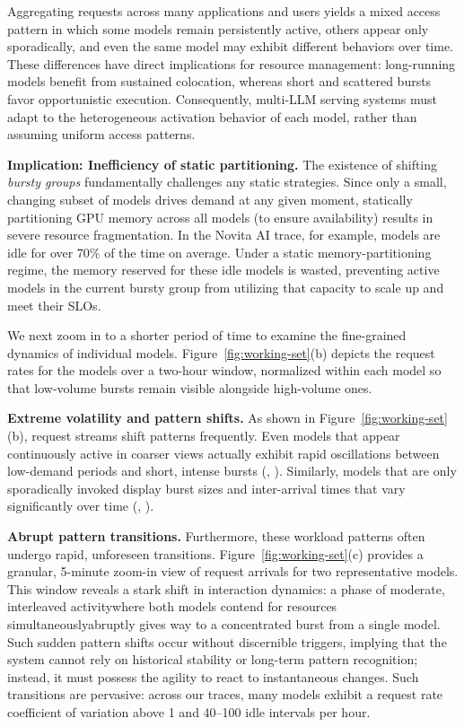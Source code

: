 Aggregating requests across many applications and users yields a mixed access pattern in which some models remain persistently active, others appear only sporadically, and even the same model may exhibit different behaviors over time. These differences have direct implications for resource management: long-running models benefit from sustained colocation, whereas short and scattered bursts favor opportunistic execution. Consequently, multi-LLM serving systems must adapt to the heterogeneous activation behavior of each model, rather than assuming uniform access patterns.

\noindent \textbf{Implication: Inefficiency of static partitioning.} The existence of shifting \textit{bursty groups} fundamentally challenges any static strategies. Since only a small, changing subset of models drives demand at any given moment, statically partitioning GPU memory across all models (to ensure availability) results in severe resource fragmentation. In the Novita AI trace, for example, models are idle for over 70\% of the time on average. Under a static memory-partitioning regime, the memory reserved for these idle models is wasted, preventing active models in the current bursty group from utilizing that capacity to scale up and meet their SLOs.

\label{sec:motivation:request}

We next zoom in to a shorter period of time to examine the fine-grained dynamics of individual models.
Figure~\ref{fig:working-set}(b) depicts the request rates for the models over a two-hour window, normalized within each model so that low-volume bursts remain visible alongside high-volume ones.

\noindent \textbf{Extreme volatility and pattern shifts.}
As shown in Figure~\ref{fig:working-set}(b), request streams shift patterns frequently.
Even models that appear continuously active in coarser views actually exhibit rapid oscillations between low-demand periods and short, intense bursts (\eg, ).
Similarly, models that are only sporadically invoked display burst sizes and inter-arrival times that vary significantly over time (\eg, ).

\noindent \textbf{Abrupt pattern transitions.} 
Furthermore, these workload patterns often undergo rapid, unforeseen transitions. Figure~\ref{fig:working-set}(c) provides a granular, 5-minute zoom-in view of request arrivals for two representative models. This window reveals a stark shift in interaction dynamics: a phase of moderate, interleaved activity\textemdash where both models contend for resources simultaneously\textemdash abruptly gives way to a concentrated burst from a single model. Such sudden pattern shifts occur without discernible triggers, implying that the system cannot rely on historical stability or long-term pattern recognition; instead, it must possess the agility to react to instantaneous changes. 
Such transitions are pervasive: across our traces, many models exhibit a request rate coefficient of variation above 1 and 40–100 idle intervals per hour.

